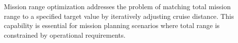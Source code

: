 Mission range optimization addresses the problem of matching total mission range to a specified target value by iteratively adjusting cruise distance. This capability is essential for mission planning scenarios where total range is constrained by operational requirements.
